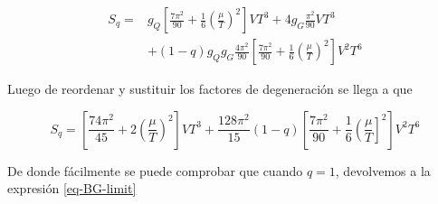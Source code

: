 \begin{equation}
\begin{split}
{S}_{q} = & {g}_{Q} \left[\frac{7{\pi}^{2}}{90} + \frac{1}{6} \left(\frac{\mu}{T} \right)^{2} \right] V{T}^{3} + 4{g}_{G} \frac{{\pi}^{2}}{90} V {T}^{3} \\
& + \left(1-q \right) {g}_{Q}{g}_{G} \frac{4{\pi}^{2}}{90} \left[\frac{7{\pi}^{2}}{90} + \frac{1}{6} \left(\frac{\mu}{T} \right)^{2}\right]{V}^{2}{T}^{6}
\end{split}
\end{equation}

Luego de reordenar y sustituir los factores de degeneración se llega a que

\begin{equation}\label{eq-Tsallis-Entropy}
{S}_{q} = \left[\frac{74{\pi}^{2}}{45} + 2 \left(\frac{\mu}{T} \right)^{2} \right]V{T}^{3} +  \frac{128{\pi}^{2}}{15} (1 - q) \left[\frac{7{\pi}^{2}}{90} + \frac{1}{6} \left(\frac{\mu}{T} \right]^{2} \right]{V}^{2}{T}^{6}
\end{equation}

De donde fácilmente se puede comprobar que cuando $q=1$, devolvemos a la expresión \eqref{eq-BG-limit} 

